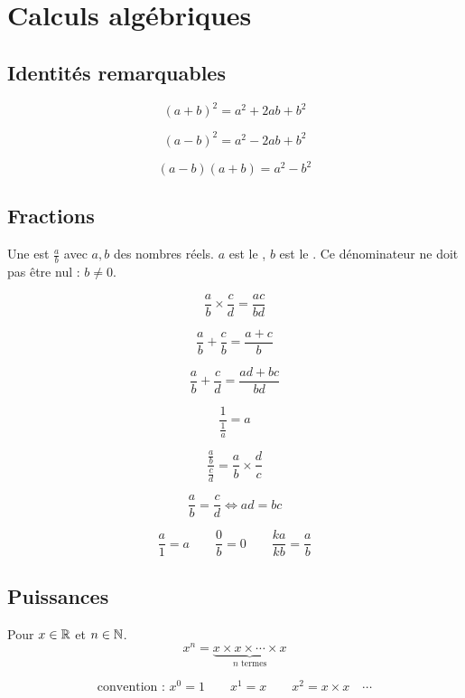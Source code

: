\documentclass[10pt,class=article,crop=false]{standalone}
\begin{document}
\section{Calculs algébriques}


\begin{multicols}{2}
	
	
\subsection{Identités remarquables}

$$(a+b) ^2 = a^2 + 2ab + b^2$$

$$(a-b) ^2 = a^2 - 2ab + b^2$$

$$(a-b)(a+b) = a^2-b^2$$

\subsection{Fractions}

Une  est $\frac{a}{b}$ avec $a,b$ des nombres réels.
$a$ est le , $b$ est le .
Ce dénominateur ne doit pas être nul : $b \neq 0$.

$$\frac{a}{b} \times \frac{c}{d} = \frac{ac}{bd}$$

$$\frac{a}{b} + \frac{c}{b} = \frac{a+ c}{b}$$

$$\frac{a}{b} + \frac{c}{d} = \frac{ad + bc}{bd}$$


$$\frac{1}{\frac{1}{a}} = a$$

$$\frac{\frac{a}{b}}{\frac{c}{d}} = \frac{a}{b} \times \frac{d}{c}$$ 

$$\frac{a}{b} = \frac{c}{d} \iff ad=bc$$

$$\frac{a}{1} = a \qquad \frac{0}{b} = 0 \qquad \frac{ka}{kb} = \frac{a}{b}$$


\subsection{Puissances}

Pour $x \in \mathbb{R}$ et $n \in \mathbb{N}$.
$$x^n = \underbrace{x \times x \times \cdots \times x}_{n \text{ termes}}$$

$$\text{convention : } x^0 = 1 \qquad x^1 = x \qquad x^2 = x \times x \quad \cdots$$


\end{multicols}
\end{document}
